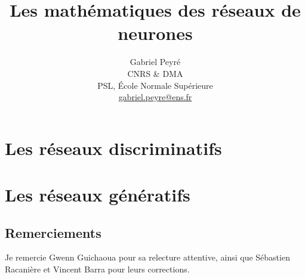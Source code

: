 \documentclass[11pt]{book}
\title{Les mathématiques des réseaux de neurones}
\author{%
\begin{tabular}{c}
	Gabriel Peyr{\'e} \\ CNRS \& DMA \\
	 PSL, \'Ecole Normale Sup\'erieure \\
	 \url{gabriel.peyre@ens.fr}
\end{tabular}
}
\date{}
\begin{document}
\maketitle

\chapter{Les réseaux discriminatifs}



\chapter{Les réseaux génératifs}



\section*{Remerciements}

Je remercie Gwenn Guichaoua pour sa relecture attentive, ainsi que Sébastien Racanière et Vincent Barra pour leurs corrections.



\end{document}
